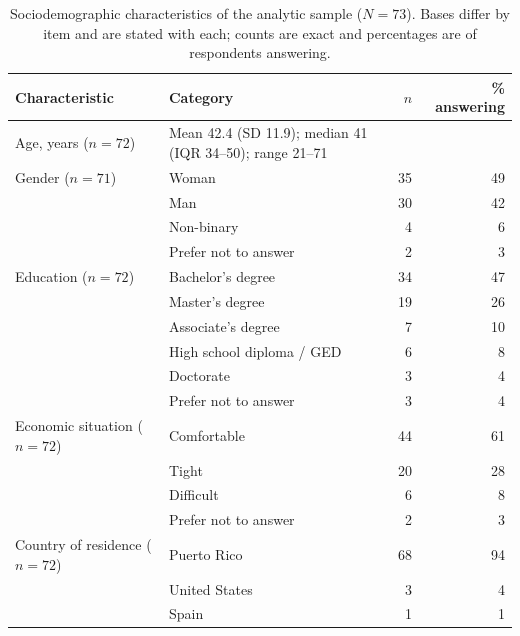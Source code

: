 \documentclass[12pt]{article}
\begin{document}
\begin{table}[htbp]
\centering
\caption{Sociodemographic characteristics of the analytic sample ($N=73$). Bases differ by item and are
stated with each; counts are exact and percentages are of respondents answering.}
\label{tab:demo}
\begin{tabular}{p{3.6cm}p{6.4cm}rr}
\toprule
Characteristic & Category & $n$ & \% answering \\
\midrule
Age, years ($n=72$) & Mean 42.4 (SD 11.9); median 41 (IQR 34--50); range 21--71 & & \\
\addlinespace
Gender ($n=71$)     & Woman & 35 & 49 \\
                    & Man & 30 & 42 \\
                    & Non-binary & 4 & 6 \\
                    & Prefer not to answer & 2 & 3 \\
\addlinespace
Education ($n=72$)  & Bachelor's degree & 34 & 47 \\
                    & Master's degree & 19 & 26 \\
                    & Associate's degree & 7 & 10 \\
                    & High school diploma / GED & 6 & 8 \\
                    & Doctorate & 3 & 4 \\
                    & Prefer not to answer & 3 & 4 \\
\addlinespace
Economic situation ($n=72$) & Comfortable & 44 & 61 \\
                    & Tight & 20 & 28 \\
                    & Difficult & 6 & 8 \\
                    & Prefer not to answer & 2 & 3 \\
\addlinespace
Country of residence ($n=72$) & Puerto Rico & 68 & 94 \\
                    & United States & 3 & 4 \\
                    & Spain & 1 & 1 \\
\bottomrule
\end{tabular}
\end{table}
\end{document}
